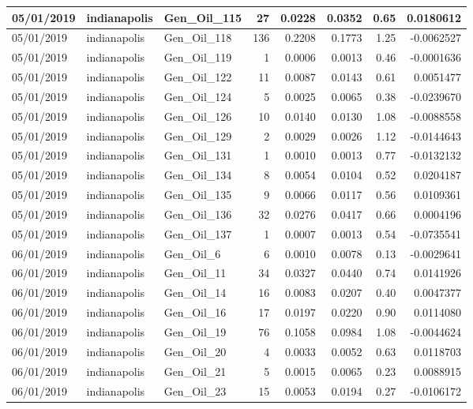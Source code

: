 \documentclass[
  letterpaper,
  DIV=11,
  numbers=noendperiod]{scrartcl}
\begin{document}
\begin{tabular}{l|l|l|r|r|r|r|r}
\hline
05/01/2019 & indianapolis & Gen\_Oil\_115 & 27 & 0.0228 & 0.0352 & 0.65 & 0.0180612\\
\hline
05/01/2019 & indianapolis & Gen\_Oil\_118 & 136 & 0.2208 & 0.1773 & 1.25 & -0.0062527\\
\hline
05/01/2019 & indianapolis & Gen\_Oil\_119 & 1 & 0.0006 & 0.0013 & 0.46 & -0.0001636\\
\hline
05/01/2019 & indianapolis & Gen\_Oil\_122 & 11 & 0.0087 & 0.0143 & 0.61 & 0.0051477\\
\hline
05/01/2019 & indianapolis & Gen\_Oil\_124 & 5 & 0.0025 & 0.0065 & 0.38 & -0.0239670\\
\hline
05/01/2019 & indianapolis & Gen\_Oil\_126 & 10 & 0.0140 & 0.0130 & 1.08 & -0.0088558\\
\hline
05/01/2019 & indianapolis & Gen\_Oil\_129 & 2 & 0.0029 & 0.0026 & 1.12 & -0.0144643\\
\hline
05/01/2019 & indianapolis & Gen\_Oil\_131 & 1 & 0.0010 & 0.0013 & 0.77 & -0.0132132\\
\hline
05/01/2019 & indianapolis & Gen\_Oil\_134 & 8 & 0.0054 & 0.0104 & 0.52 & 0.0204187\\
\hline
05/01/2019 & indianapolis & Gen\_Oil\_135 & 9 & 0.0066 & 0.0117 & 0.56 & 0.0109361\\
\hline
05/01/2019 & indianapolis & Gen\_Oil\_136 & 32 & 0.0276 & 0.0417 & 0.66 & 0.0004196\\
\hline
05/01/2019 & indianapolis & Gen\_Oil\_137 & 1 & 0.0007 & 0.0013 & 0.54 & -0.0735541\\
\hline
06/01/2019 & indianapolis & Gen\_Oil\_6 & 6 & 0.0010 & 0.0078 & 0.13 & -0.0029641\\
\hline
06/01/2019 & indianapolis & Gen\_Oil\_11 & 34 & 0.0327 & 0.0440 & 0.74 & 0.0141926\\
\hline
06/01/2019 & indianapolis & Gen\_Oil\_14 & 16 & 0.0083 & 0.0207 & 0.40 & 0.0047377\\
\hline
06/01/2019 & indianapolis & Gen\_Oil\_16 & 17 & 0.0197 & 0.0220 & 0.90 & 0.0114080\\
\hline
06/01/2019 & indianapolis & Gen\_Oil\_19 & 76 & 0.1058 & 0.0984 & 1.08 & -0.0044624\\
\hline
06/01/2019 & indianapolis & Gen\_Oil\_20 & 4 & 0.0033 & 0.0052 & 0.63 & 0.0118703\\
\hline
06/01/2019 & indianapolis & Gen\_Oil\_21 & 5 & 0.0015 & 0.0065 & 0.23 & 0.0088915\\
\hline
06/01/2019 & indianapolis & Gen\_Oil\_23 & 15 & 0.0053 & 0.0194 & 0.27 & -0.0106172\\

\end{tabular}
\end{document}
